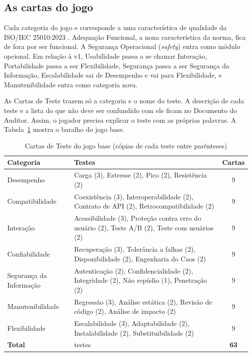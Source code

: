 \subsection{As cartas do jogo}
\label{sec:cartas}

Cada categoria do jogo  e corresponde a uma característica de
qualidade da ISO/IEC 25010:2023 \cite{iso25010}. Adequação Funcional, a nona característica da norma, fica de fora por ser
funcional. A Segurança Operacional (\emph{safety}) entra como módulo opcional. Em relação à v1, Usabilidade passa
a se chamar Interação, Portabilidade passa a ser Flexibilidade, Segurança passa a ser Segurança da Informação,
Escalabilidade sai de Desempenho e vai para Flexibilidade, e Manutenibilidade entra como categoria nova.

As Cartas de Teste trazem só a categoria e o nome do teste. A descrição de cada teste e a lista do que não deve
ser confundido com ele ficam no Documento do Auditor. Assim, o jogador precisa explicar o teste com as próprias
palavras. A Tabela~\ref{tab:cartas} mostra o baralho do jogo base.

\begin{table}[ht]
  \centering
  \caption{Cartas de Teste do jogo base (cópias de cada teste entre parênteses)}
  \label{tab:cartas}
  \footnotesize
  \begin{tabularx}{\linewidth}{>{\raggedright\arraybackslash}p{3.3cm} >{\raggedright\arraybackslash}X c}
    \toprule
    Categoria & Testes & Cartas \\
    \midrule
    Desempenho & Carga (3), Estresse (2), Pico (2), Resistência (2) & 9 \\
    Compatibilidade & Coexistência (3), Interoperabilidade (2), Contrato de API (2), Retrocompatibilidade (2) & 9 \\
    Interação & Acessibilidade (3), Proteção contra erro do usuário (2), Teste A/B (2), Teste com usuários (2) & 9 \\
    Confiabilidade & Recuperação (3), Tolerância a falhas (2), Disponibilidade (2), Engenharia do Caos (2) & 9 \\
    Segurança da Informação & Autenticação (2), Confidencialidade (2), Integridade (2), Não repúdio (1), Penetração (2) & 9 \\
    Manutenibilidade & Regressão (3), Análise estática (2), Revisão de código (2), Análise de impacto (2) & 9 \\
    Flexibilidade & Escalabilidade (3), Adaptabilidade (2), Instalabilidade (2), Substituibilidade (2) & 9 \\
    \midrule
    \textbf{Total} & 29 testes & \textbf{63} \\
    \bottomrule
  \end{tabularx}
\end{table}

